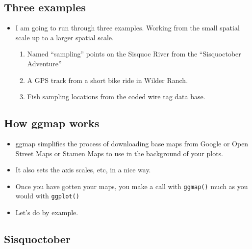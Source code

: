 \documentclass[]{book}
\providecommand{\tightlist}{%
  \setlength{\itemsep}{0pt}\setlength{\parskip}{0pt}}
\theoremstyle{definition}
\theoremstyle{definition}
\theoremstyle{remark}
\begin{document}
\subsection{Three examples}\label{three-examples}

\begin{itemize}
\tightlist
\item
  I am going to run through three examples. Working from the small
  spatial scale up to a larger spatial scale.

  \begin{enumerate}
  \def\labelenumi{\arabic{enumi}.}
  \tightlist
  \item
    Named ``sampling'' points on the Sisquoc River from the
    ``Sisquoctober Adventure''
  \item
    A GPS track from a short bike ride in Wilder Ranch.
  \item
    Fish sampling locations from the coded wire tag data base.
  \end{enumerate}
\end{itemize}

\subsection{How ggmap works}\label{how-ggmap-works}

\begin{itemize}
\tightlist
\item
  ggmap simplifies the process of downloading base maps from Google or
  Open Street Maps or Stamen Maps to use in the background of your
  plots.
\item
  It also sets the axis scales, etc, in a nice way.\\
\item
  Once you have gotten your maps, you make a call with \texttt{ggmap()}
  much as you would with \texttt{ggplot()}
\item
  Let's do by example.
\end{itemize}

\subsection{Sisquoctober}\label{sisquoctober}
\end{document}
